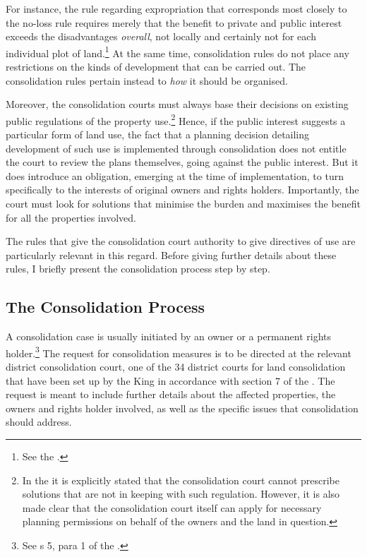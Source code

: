 For instance, the rule regarding expropriation that corresponds most closely to the no-loss rule requires merely that the benefit to private and public interest exceeds the disadvantages \emph{overall}, not locally and certainly not for each individual plot of land.\footnote{See the \cite[2]{ea59}.} At the same time, consolidation rules do not place any restrictions on the kinds of development that can be carried out. The consolidation rules pertain instead to \emph{how} it should be organised. 

Moreover, the consolidation courts must always base their decisions on existing public regulations of the property use.\footnote{In the \cite[3-17]{lca13} it is explicitly stated that the consolidation court cannot prescribe solutions that are not in keeping with such regulation. However, it is also made clear that the consolidation court itself can apply for necessary planning permissions on behalf of the owners and the land in question.}
Hence, if the public interest suggests a particular form of land use, the fact that a planning decision detailing development of such use is implemented through consolidation does not entitle the court to review the plans themselves, going against the public interest. But it does introduce an obligation, emerging at the time of implementation, to turn specifically to the interests of original owners and rights holders. Importantly, the court must look for solutions that minimise the burden and maximises the benefit for all the properties involved.

The rules that give the consolidation court authority to give directives of use are particularly relevant in this regard. Before giving further details about these rules, I briefly present the consolidation process step by step.

\subsection{The Consolidation Process}\label{subsec:lcp}

A consolidation case is usually initiated by an owner or a permanent rights holder.\footnote{See s 5, para 1 of the \cite{lca79}.} The request for consolidation measures is to be directed at the relevant district consolidation court, one of the 34 district courts for land consolidation that have been set up by the King in accordance with section 7 of the \cite{lca79}. The request is meant to include further details about the affected properties, the owners and rights holder involved, as well as the specific issues that consolidation should address.

